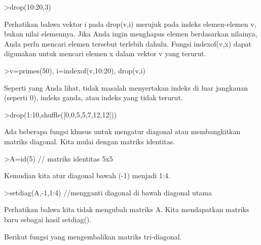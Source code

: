 \documentclass[a4paper,10pt]{article}
\begin{document}
\begin{eulernotebook}
\begin{euleroutput}
\end{euleroutput}
\begin{eulerprompt}
>drop(10:20,3)
\end{eulerprompt}
\begin{euleroutput}
  
  Perhatikan bahwa vektor i pada drop(v,i) merujuk pada indeks elemen-elemen v, bukan nilai elemennya. Jika Anda ingin menghapus elemen berdasarkan nilainya, Anda perlu mencari elemen tersebut terlebih dahulu. Fungsi indexof(v,x) dapat digunakan untuk mencari elemen x dalam vektor v yang terurut.
  
\end{euleroutput}
\begin{eulerprompt}
>v=primes(50), i=indexof(v,10:20), drop(v,i)
\end{eulerprompt}
\begin{euleroutput}
  
  Seperti yang Anda lihat, tidak masalah menyertakan indeks di luar jangkauan (seperti 0), indeks ganda, atau indeks yang tidak terurut.
  
\end{euleroutput}
\begin{eulerprompt}
>drop(1:10,shuffle([0,0,5,5,7,12,12]))
\end{eulerprompt}
\begin{euleroutput}
  
  Ada beberapa fungsi khusus untuk mengatur diagonal atau membangkitkan matriks diagonal. Kita mulai dengan matriks identitas.
  
\end{euleroutput}
\begin{eulerprompt}
>A=id(5) // matriks identitas 5x5
\end{eulerprompt}
\begin{euleroutput}
  
  Kemudian kita atur diagonal bawah (-1) menjadi 1:4.
  
\end{euleroutput}
\begin{eulerprompt}
>setdiag(A,-1,1:4) //mengganti diagonal di bawah diagonal utama
\end{eulerprompt}
\begin{euleroutput}
  
  Perhatikan bahwa kita tidak mengubah matriks A. Kita mendapatkan matriks baru sebagai hasil setdiag().
  
  Berikut fungsi yang mengembalikan matriks tri-diagonal.
  

\end{euleroutput}
\end{eulernotebook}
\end{document}

